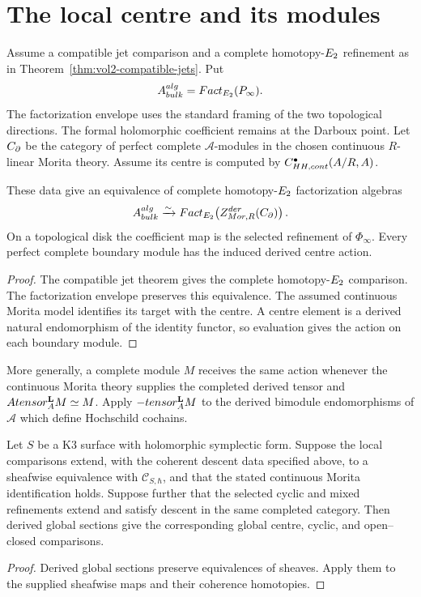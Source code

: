 \section{The local centre and its modules}
Assume a compatible jet comparison and a complete homotopy-$E_2$
refinement as in Theorem~\ref{thm:vol2-compatible-jets}.
Put
\[
 A_{bulk}^{alg}
 =Fact_{E_2}(P_\infty).
\]
The factorization envelope uses the standard framing of the two topological directions.
The formal holomorphic coefficient remains at the Darboux point.
Let $C_\partial$ be the category of perfect complete $\mathcal A$-modules
in the chosen continuous $R$-linear Morita theory.
Assume its centre is computed by
$C^\bullet_{HH,cont}(A/R,A)$.

\begin{theorem}
These data give an equivalence of complete homotopy-$E_2$ factorization algebras
\[
 A_{bulk}^{alg}
 \xrightarrow{\sim}
 Fact_{E_2}\!\left(
 Z^{der}_{Mor,R}(C_\partial)\right).
\]
On a topological disk the coefficient map is the selected refinement
of $\Phi_\infty$.  Every perfect complete boundary module has the
induced derived centre action.
\end{theorem}
\begin{proof}
The compatible jet theorem gives the complete homotopy-$E_2$ comparison.
The factorization envelope preserves this equivalence.
The assumed continuous Morita model identifies its target with the centre.
A centre element is a derived natural endomorphism of the identity functor,
so evaluation gives the action on each boundary module.
\end{proof}

More generally, a complete module $M$ receives the same action whenever
the continuous Morita theory supplies the completed derived tensor and
$Atensor_{A}^{\mathbf L}M\simeq M$.
Apply $-tensor_{A}^{\mathbf L}M$ to the derived
bimodule endomorphisms of $\mathcal A$ which define Hochschild cochains.

\begin{corollary}
Let $S$ be a K3 surface with holomorphic symplectic form.
Suppose the local comparisons extend, with the coherent descent data
specified above, to a sheafwise equivalence with
$\mathcal C_{S,\hbar}$, and that the stated continuous Morita
identification holds.
Suppose further that the selected cyclic and mixed refinements extend
and satisfy descent in the same completed category.
Then derived global sections give the corresponding global centre,
cyclic, and open--closed comparisons.
\end{corollary}
\begin{proof}
Derived global sections preserve equivalences of sheaves.
Apply them to the supplied sheafwise maps and their coherence homotopies.
\end{proof}


